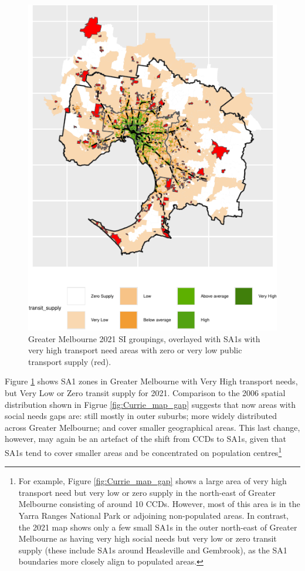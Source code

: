 \documentclass[preprint, 3p,
authoryear]{elsarticle} %
\begin{document}
\begin{figure}
\includegraphics[width=1\linewidth]{Leveraging_GTFS_to_assess_transit_supply_Transport_Geography_files/figure-latex/Greater_Melbourne_2021_needs_gap_map-1} \caption{Greater Melbourne 2021 SI groupings, overlayed with SA1s with very high transport need areas with zero or very low public transport supply (red).}\label{fig:Greater_Melbourne_2021_needs_gap_map}
\end{figure}

Figure \ref{fig:Greater_Melbourne_2021_needs_gap_map} shows SA1 zones in
Greater Melbourne with Very High transport needs, but Very Low or Zero
transit supply for 2021. Comparison to the 2006 spatial distribution
shown in Figrue \ref{fig:Currie_map_gap} suggests that now areas with
social needs gaps are: still mostly in outer suburbs; more widely
distributed across Greater Melbourne; and cover smaller geographical
areas. This last change, however, may again be an artefact of the shift
from CCDs to SA1s, given that SA1s tend to cover smaller areas and be
concentrated on population centres\footnote{For example, Figure
  \ref{fig:Currie_map_gap} shows a large area of very high transport
  need but very low or zero supply in the north-east of Greater
  Melbourne consisting of around 10 CCDs. However, most of this area is
  in the Yarra Ranges National Park or adjoining non-populated areas. In
  contrast, the 2021 map shows only a few small SA1s in the outer
  north-east of Greater Melbourne as having very high social needs but
  very low or zero transit supply (these include SA1s around Heasleville
  and Gembrook), as the SA1 boundaries more closely align to populated
  areas.}
\end{document}
